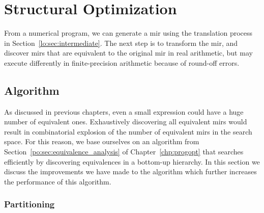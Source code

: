 \section{Structural Optimization}
\label{lo:sec:structural_optimization}

From a numerical program, we can generate a \gls{mir} using the translation
process in Section~\ref{lo:sec:intermediate}.  The next step is to transform
the \gls{mir}, and discover \glspl{mir} that are equivalent to the original
\gls{mir} in real arithmetic, but may execute differently in finite-precision
arithmetic because of round-off errors.

\subsection{Algorithm}
\label{lo:sub:algorithm}


As discussed in previous chapters, even a small expression could have a huge
number of equivalent ones.  Exhaustively discovering all equivalent \glspl{mir}
would result in combinatorial explosion of the number of equivalent \glspl{mir}
in the search space.  For this reason, we base ourselves on an algorithm from
Section~\ref{po:sec:equivalence_analysis} of Chapter~\ref{chp:progopt} that
searches efficiently by discovering equivalences in a bottom-up hierarchy.  In
this section we discuss the improvements we have made to the algorithm which
further increases the performance of this algorithm.

\subsubsection{Partitioning}


